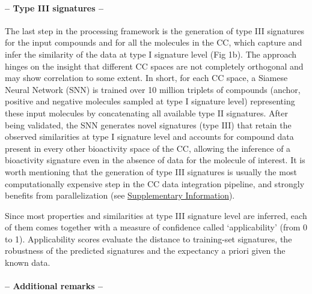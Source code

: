 \paragraph{-- Type III signatures --} \leavevmode


The last step in the processing framework is the generation of type III signatures for the input compounds and for all the molecules in the CC, which capture and infer the similarity of the data at type I signature level (Fig 1b). The approach hinges on the insight that different CC spaces are not completely orthogonal and may show correlation to some extent. In short, for each CC space, a Siamese Neural Network (SNN) is trained over 10 million triplets of compounds (anchor, positive and negative molecules sampled at type I signature level) representing these input molecules by concatenating all available type II signatures. After being validated, the SNN generates novel signatures (type III) that retain the observed similarities at type I signature level and accounts for compound data present in every other bioactivity space of the CC, allowing the inference of a bioactivity signature even in the absence of data for the molecule of interest. It is worth mentioning that the generation of type III signatures is usually the most computationally expensive step in the CC data integration pipeline, and strongly benefits from parallelization (see \hyperref[Protocols_SupplementaryInformation]{Supplementary Information}).

Since most properties and similarities at type III signature level are inferred, each of them comes together with a measure of confidence called ‘applicability’ (from 0 to 1). Applicability scores evaluate the distance to training-set signatures, the robustness of the predicted signatures and the expectancy a priori given the known data. 

\paragraph{-- Additional remarks --} \leavevmode


